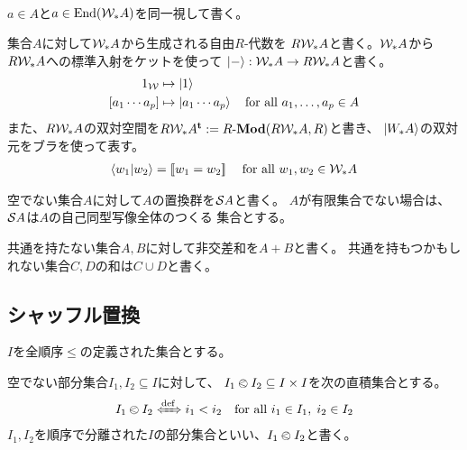 {\begin{description}
\begin{equation*}
\begin{split}
		\end{split}\end{equation*}
		$a\in A$と$a\in {\ensuremath{\operatorname{End}}}({{\mathcal{W}}}_*A)$を同一視して書く。
		\item[自由代数] 集合$A$に対して${{\mathcal{W}}}_*A$から生成される自由$R$-代数を
		$R{{\mathcal{W}}}_*A$と書く。${{\mathcal{W}}}_*A$から$R{{\mathcal{W}}}_*A$への標準入射をケットを使って
		$\mathinner{|{-}\rangle}:{{\mathcal{W}}}_*A\to R{{\mathcal{W}}}_*A$と書く。
		\begin{equation*}\begin{split}
				1_{{\mathcal{W}}} &\mapsto \mathinner{|{1}\rangle} \\
				[a_1\cdots a_p] &\mapsto \mathinner{|{a_1\cdots a_p}\rangle}
				\quad\text{for all } a_1,\dots,a_p\in A
		\end{split}\end{equation*}
		また、$R{{\mathcal{W}}}_*A$の双対空間を$R\W_*A^\tran:=\Mod{R}(R\W_*A,R)$と書き、
		$\mathinner{|{W_*A}\rangle}$の双対元をブラを使って表す。
		\begin{equation*}\begin{split}
			\mathinner{\langle{w_1|w_2}\rangle} = [\![w_1 = w_2]\!]\;
			\quad\text{for all } w_1,w_2\in {\ensuremath{{\mathcal{W}}}}_*A
		\end{split}\end{equation*}
		\item[置換群] 空でない集合$A$に対して$A$の置換群を${{\mathcal{S}}} A$と書く。
		$A$が有限集合でない場合は、${{\mathcal{S}}} A$は$A$の自己同型写像全体のつくる
		集合とする。
		\item[非交差和] 共通を持たない集合$A,B$に対して非交差和を$A+B$と書く。
		共通を持もつかもしれない集合$C,D$の和は$C\cup D$と書く。
	\end{description} %

\subsection{シャッフル置換}\label{s2:シャッフル置換} %
	$I$を全順序$\le$の定義された集合とする。

	\begin{definition}[順序で分離された部分集合]
	\label{def:順序で分離された部分集合} %
		空でない部分集合$I_1,I_2\subseteq I$に対して、
		$I_1\olessthan I_2\subseteq I\times I$を次の直積集合とする。
		\begin{equation*}\begin{split}
			I_1\oless I_2 \xiff{\dfn} 
				i_1 < i_2 \quad\text{for all } i_1\in I_1,\; i_2\in I_2
		\end{split}\end{equation*}
		$I_1,I_2$を順序で分離された$I$の部分集合といい、$I_1\olessthan I_2$と書く。
	\end{definition} %

}
